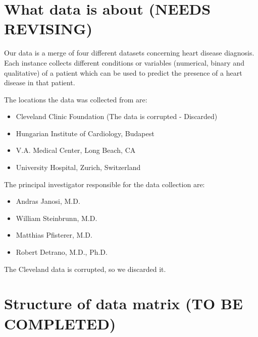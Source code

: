\documentclass[a4paper,12pt]{article}
\begin{document}
\section{What data is about (\textbf{NEEDS REVISING})}

    Our data is a merge of four different datasets concerning heart disease diagnosis.
    Each instance collects different conditions or variables (numerical, binary and qualitative) of a patient
    which can be used to predict the presence of a heart disease in that patient.
    
    The locations the data was collected from are:

    \begin{itemize}

        \item Cleveland Clinic Foundation (The data is corrupted - Discarded)
        \item Hungarian Institute of Cardiology, Budapest
        \item V.A. Medical Center, Long Beach, CA
        \item University Hospital, Zurich, Switzerland

    \end{itemize}

    The principal investigator responsible for the data collection are:

    \begin{itemize}

        \item Andras Janosi, M.D.
        \item William Steinbrunn, M.D.
        \item Matthias Pfisterer, M.D.
        \item Robert Detrano, M.D., Ph.D.

    \end{itemize}

    The Cleveland data is corrupted, so we discarded it.

\section{Structure of data matrix (\textbf{TO BE COMPLETED})}
\end{document}
